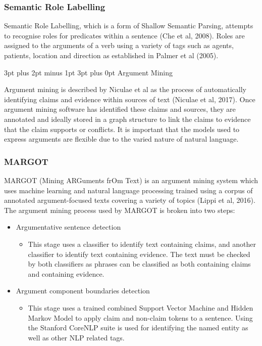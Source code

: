 \documentclass[12pt,a4paper]{article}
\makeatletter
\renewcommand\subsection{\@startsection {subsection}{1}{2mm} %
                               {3pt plus 2pt minus 1pt} %
                               {3pt plus 0pt} %
                               {\normalfont\bfseries}}
\makeatother
\begin{document}
\subsubsection{Semantic Role Labelling}

Semantic Role Labelling, which is a form of Shallow Semantic Parsing, attempts to recognise roles for predicates within a sentence (Che et al, 2008). Roles are assigned to the arguments of a verb using a variety of tags such as agents, patients, location and direction as established in Palmer et al (2005).

\subsection{Argument Mining}

Argument mining is described by Niculae et al as the process of automatically identifying claims and evidence within sources of text (Niculae et al, 2017). Once argument mining software has identified these claims and sources, they are annotated and ideally stored in a graph structure to link the claims to evidence that the claim supports or conflicts. It is important that the models used to express arguments are flexible due to the varied nature of natural language.

\subsubsection{MARGOT}

MARGOT (Mining ARGuments frOm Text) is an argument mining system which uses machine learning and natural language processing trained using a corpus of annotated argument-focused texts covering a variety of topics (Lippi et al, 2016). The argument mining process used by MARGOT is broken into two steps:

\begin{itemize}
    \item Argumentative sentence detection
    \begin{itemize}
        \item This stage uses a classifier to identify text containing claims, and another classifier to identify text containing evidence. The text must be checked by both classifiers as phrases can be classified as both containing claims and containing evidence.
    \end{itemize}
    \item Argument component boundaries detection
    \begin{itemize}
        \item This stage uses a trained combined Support Vector Machine and Hidden Markov Model to apply claim and non-claim tokens to a sentence. Using the Stanford CoreNLP suite is used for identifying the named entity as well as other NLP related tags. 
    \end{itemize}
\end{itemize}
\end{document}
